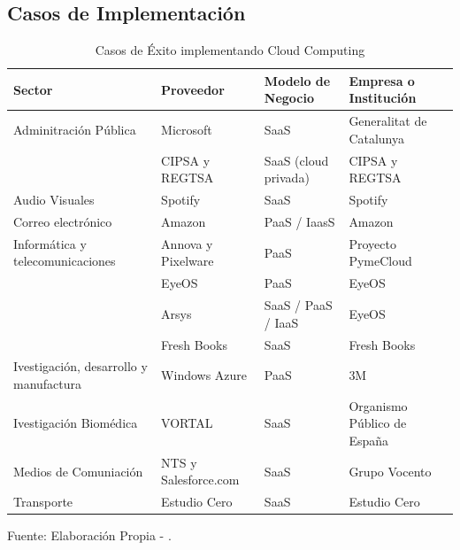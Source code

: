 \documentclass[a4paper, 12pt]{report}
\begin{document}
\begin{justify}
\section{Casos de Implementación}
\begin{center}
\begin{table}[ht]
\centering
\caption{Casos de \'Exito implementando Cloud Computing}
\begin{tabular}{|p{4.5cm} |p{2cm} |p{2.5cm} |p{4cm}|} \hline
\bf{Sector} & \bf{Proveedor} & \bf{Modelo de Negocio} & \bf{Empresa o Institución} 
\\ \hline
Adminitraci\'on P\'ublica & Microsoft & SaaS &  Generalitat de Catalunya 
\\ \cline{2-4}
 & CIPSA y REGTSA & SaaS (cloud privada) & CIPSA y REGTSA  
\\ \hline
Audio Visuales  & Spotify & SaaS & Spotify
\\ \hline
Correo electr\'onico & Amazon & PaaS / IaasS & Amazon
\\ \hline
Inform\'atica y telecomunicaciones & Annova y Pixelware & PaaS & Proyecto PymeCloud 
\\ \cline{2-4}
 & EyeOS & PaaS & EyeOS  
\\ \cline{2-4}
 & Arsys & SaaS / PaaS / IaaS & EyeOS  
\\  \cline{2-4}
 & Fresh Books & SaaS & Fresh Books  
\\  \hline
Ivestigaci\'on, desarrollo y manufactura & Windows Azure & PaaS & 3M 
\\ \hline
Ivestigaci\'on Biom\'edica & VORTAL & SaaS & Organismo P\'ublico de España 
\\ \hline
Medios de Comuniaci\'on & NTS y Salesforce.com & SaaS & Grupo Vocento \\ \hline
Transporte & Estudio Cero & SaaS & Estudio Cero\\ \hline 
\end{tabular}
\vskip 0.2cm
\begin{center}
{\small{Fuente: Elaboraci\'on Propia - \cite{Ferrari}.}}
\end{center}
\end{table}
\end{center}

\end{justify}
\end{document}
